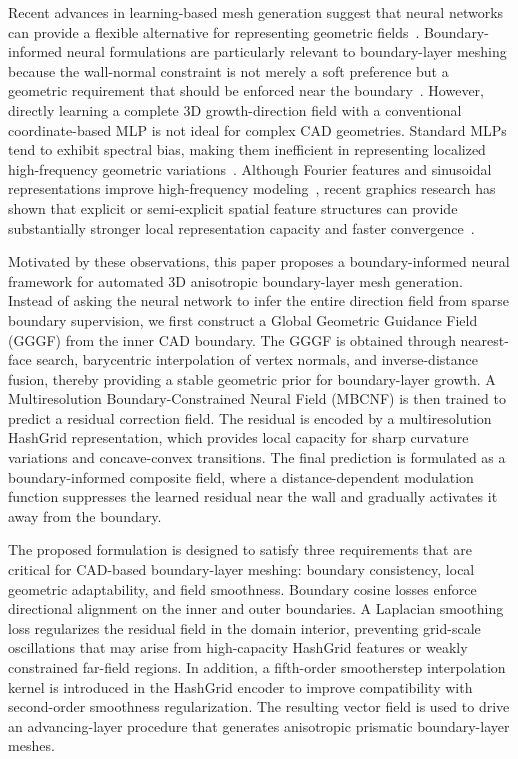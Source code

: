 \documentclass[%
 aip,
 amsmath,amssymb,
 reprint,%
nobibnotes,
]{revtex4-1}
\begin{document}
Recent advances in learning-based mesh generation suggest that neural networks can provide a flexible alternative for representing geometric fields~\cite{lei2024survey}. Boundary-informed neural formulations are particularly relevant to boundary-layer meshing because the wall-normal constraint is not merely a soft preference but a geometric requirement that should be enforced near the boundary~\cite{raissi2019pinn,sun2020physicsconstrained,anisoMeshNet}. However, directly learning a complete 3D growth-direction field with a conventional coordinate-based MLP is not ideal for complex CAD geometries. Standard MLPs tend to exhibit spectral bias, making them inefficient in representing localized high-frequency geometric variations~\cite{rahaman2019spectral}. Although Fourier features and sinusoidal representations improve high-frequency modeling~\cite{tancik2020fourier,sitzmann2020siren}, recent graphics research has shown that explicit or semi-explicit spatial feature structures can provide substantially stronger local representation capacity and faster convergence~\cite{yu2022plenoxels,sun2022dvgo,chen2022tensorf,muller2022instantngp}.

Motivated by these observations, this paper proposes a boundary-informed neural framework for automated 3D anisotropic boundary-layer mesh generation. Instead of asking the neural network to infer the entire direction field from sparse boundary supervision, we first construct a Global Geometric Guidance Field (GGGF) from the inner CAD boundary. The GGGF is obtained through nearest-face search, barycentric interpolation of vertex normals, and inverse-distance fusion, thereby providing a stable geometric prior for boundary-layer growth. A Multiresolution Boundary-Constrained Neural Field (MBCNF) is then trained to predict a residual correction field. The residual is encoded by a multiresolution HashGrid representation, which provides local capacity for sharp curvature variations and concave-convex transitions. The final prediction is formulated as a boundary-informed composite field, where a distance-dependent modulation function suppresses the learned residual near the wall and gradually activates it away from the boundary.

The proposed formulation is designed to satisfy three requirements that are critical for CAD-based boundary-layer meshing: boundary consistency, local geometric adaptability, and field smoothness. Boundary cosine losses enforce directional alignment on the inner and outer boundaries. A Laplacian smoothing loss regularizes the residual field in the domain interior, preventing grid-scale oscillations that may arise from high-capacity HashGrid features or weakly constrained far-field regions. In addition, a fifth-order smootherstep interpolation kernel is introduced in the HashGrid encoder to improve compatibility with second-order smoothness regularization. The resulting vector field is used to drive an advancing-layer procedure that generates anisotropic prismatic boundary-layer meshes.
\end{document}
